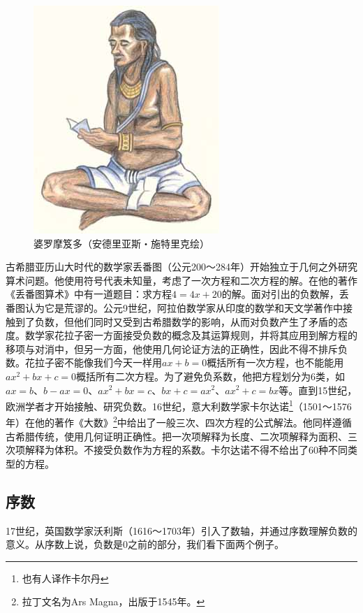 \documentclass[b5paper]{ctexart}
\begin{document}
\begin{figure}[htbp]
 \centering
 \includegraphics[scale=0.3]{img/Brahmagupta}
 \caption{婆罗摩笈多（安德里亚斯・施特里克绘）}
 \label{fig:yinyang}
\end{figure}

 
古希腊亚历山大时代的数学家丢番图（公元200～284年）开始独立于几何之外研究算术问题。他使用符号代表未知量，考虑了一次方程和二次方程的解。在他的著作《丢番图算术》中有一道题目：求方程$4 = 4x + 20$的解。面对引出的负数解，丢番图认为它是荒谬的。公元9世纪，阿拉伯数学家从印度的数学和天文学著作中接触到了负数，但他们同时又受到古希腊数学的影响，从而对负数产生了矛盾的态度。数学家花拉子密一方面接受负数的概念及其运算规则，并将其应用到解方程的移项与对消中，但另一方面，他使用几何论证方法的正确性，因此不得不排斥负数。花拉子密不能像我们今天一样用$ax + b = 0$概括所有一次方程，也不能能用$ax^2 + bx + c = 0$概括所有二次方程。为了避免负系数，他把方程划分为6类，如$ax = b$、$b - ax = 0$、$ax^2 + bx = c$、$bx + c = ax^2$、$ax^2 + c = bx$等。直到15世纪，欧洲学者才开始接触、研究负数。16世纪，意大利数学家卡尔达诺\footnote{也有人译作卡尔丹}（1501～1576年）在他的著作《大数》\footnote{拉丁文名为Ars Magna，出版于1545年。}中给出了一般三次、四次方程的公式解法。他同样遵循古希腊传统，使用几何证明正确性。把一次项解释为长度、二次项解释为面积、三次项解释为体积。不接受负数作为方程的系数。卡尔达诺不得不给出了60种不同类型的方程。

\subsection{序数}
  
17世纪，英国数学家沃利斯（1616～1703年）引入了数轴，并通过序数理解负数的意义。从序数上说，负数是0之前的部分，我们看下面两个例子。
\end{document}
